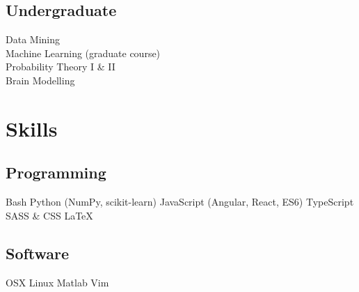 \documentclass[]{deedy-resume-openfont}
\begin{document}
\begin{minipage}[t]{0.33\textwidth}
\subsection{Undergraduate}
Data Mining \\
Machine Learning (graduate course) \\
Probability Theory I \& II \\ 
Brain Modelling


\section{Skills}
\subsection{Programming}
Bash \textbullet{} Python (NumPy, scikit-learn) \textbullet{} JavaScript (Angular, React, ES6) \textbullet{} TypeScript \textbullet{} SASS \& CSS \textbullet{} \LaTeX \textbullet{}
\sectionsep

\subsection{Software}
OSX \textbullet{} Linux \textbullet{} Matlab \textbullet{}
Vim

%
%

\end{minipage} 
\hfill
\end{document}
